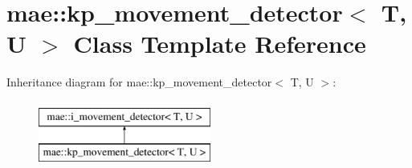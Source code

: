 \hypertarget{classmae_1_1kp__movement__detector}{\section{mae\-:\-:kp\-\_\-movement\-\_\-detector$<$ T, U $>$ Class Template Reference}
\label{classmae_1_1kp__movement__detector}
}
Inheritance diagram for mae\-:\-:kp\-\_\-movement\-\_\-detector$<$ T, U $>$\-:\begin{figure}[H]
\begin{center}
\leavevmode
\includegraphics[height=2.000000cm]{classmae_1_1kp__movement__detector}
\end{center}
\end{figure}
